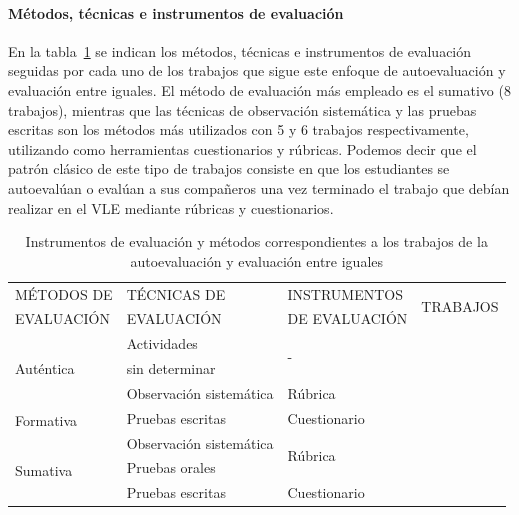 \paragraph*{Métodos, técnicas e instrumentos de evaluación}
En la tabla~\ref{tab:MetodosAuto} se indican los métodos, técnicas e instrumentos de evaluación seguidas por cada uno de los trabajos que sigue este enfoque de autoevaluación y evaluación entre iguales. El método de evaluación más empleado es el sumativo (8 trabajos), mientras que las técnicas de observación sistemática y las pruebas escritas son los métodos más utilizados con 5 y 6 trabajos respectivamente, utilizando como herramientas cuestionarios y rúbricas. Podemos decir que el patrón clásico de este tipo de trabajos consiste en que los estudiantes se autoevalúan o evalúan a sus compañeros una vez terminado el trabajo que debían realizar en el VLE mediante rúbricas y cuestionarios. 

\begin{table}
  \begin{center}
  \begin{tabular}{| m{3cm} | m{3cm} | m{3.5cm} | m{2cm} |} %
    \hline
    MÉTODOS DE  & TÉCNICAS DE  & INSTRUMENTOS  & \multirow{2}{*}{TRABAJOS} \\
    EVALUACIÓN & EVALUACIÓN & DE EVALUACIÓN &  \\
    \hline
    \hline
    \multirow{4}{*}{Auténtica} & Actividades   & \multirow{2}{*}{-} & \multirow{2}{*}{\cite{renau2010teaching}} \\
     & sin determinar  &  &  \\
    \cline{2-4}
     & \multirow{2}{3cm}{Observación sistemática} & \multirow{2}{*}{Rúbrica} & \multirow{2}{*}{\cite{oliver2013graduate}} \\
     &  &  &  \\
    \hline
    \multirow{2}{*}{Formativa} & Pruebas escritas & Cuestionario & \cite{achcaoucaou2014competence}  \\
    \cline{2-4}
     & \multirow{2}{3cm}{Observación sistemática} & \multirow{3}{*}{Rúbrica} & \cite{arno2011promoting,piedra2010measuring} \\
    \cline{1-1} \cline{4-4}
    \multirow{3}{*}{Sumativa} &  &  & \cite{carreras2013promotion,lasa2013problem}  \\
    \cline{2-2} \cline{4-4}
     & Pruebas orales &  & \cite{masip2013self} \\
    \cline{2-4}
     & Pruebas escritas & Cuestionario & \cite{chang2009international,ficapal2015learning,martinez2014teamwork,ruizacarate2013soft,sevilla2012assessment} \\
    \hline
  \end{tabular}
\end{center}
\caption{Instrumentos de evaluación y métodos correspondientes a los trabajos de la autoevaluación y evaluación entre iguales}
\label{tab:MetodosAuto}
\end{table}

